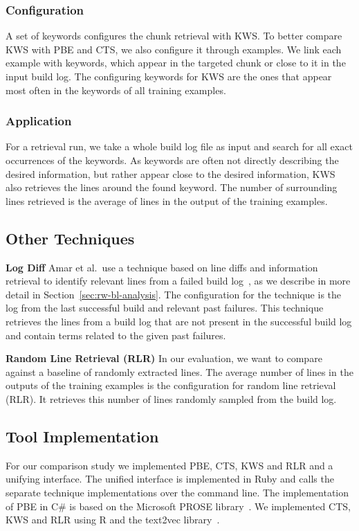\subsubsection{Configuration}
A set of keywords configures the chunk retrieval with KWS\@.
To better compare KWS with PBE and CTS, we also configure it through examples.
We link each example with keywords, which appear in the targeted chunk or close to it in the input build log.
The configuring keywords for KWS are the ones that appear most often in the keywords of all training examples.

\subsubsection{Application}
For a retrieval run, we take a whole build log file as input and search for all exact occurrences of the keywords.
As keywords are often not directly describing the desired information, but rather appear close to the desired information, KWS also retrieves the lines around the found keyword.
The number of surrounding lines retrieved is the average of lines in the output of the training examples.

\subsection{Other Techniques}
\label{sec:expl-rlr}

\noindent
\textbf{Log Diff}
Amar et al.\ use a technique based on line diffs and information retrieval to identify relevant lines from a failed build log~\cite{amar2019mining}, as we describe in more detail in Section~\ref{sec:rw-bl-analysis}.
The configuration for the technique is the log from the last successful build and relevant past failures.
This technique retrieves the lines from a build log that are not present in the successful build log and contain terms related to the given past failures.

\noindent
\textbf{Random Line Retrieval (RLR)}
In our evaluation, we want to compare against a baseline of randomly extracted lines.
The average number of lines in the outputs of the training examples is the configuration for random line retrieval (RLR).
It retrieves this number of lines randomly sampled from the build log.

\subsection{Tool Implementation}
For our comparison study we implemented PBE, CTS, KWS and RLR and a unifying interface.
The unified interface is implemented in Ruby and calls the separate technique implementations over the command line.
The implementation of PBE in C\# is based on the Microsoft PROSE library~\cite{prose2019webpage}.
We implemented CTS, KWS and RLR using R and the text2vec library~\cite{text2vec2019webpage}.


